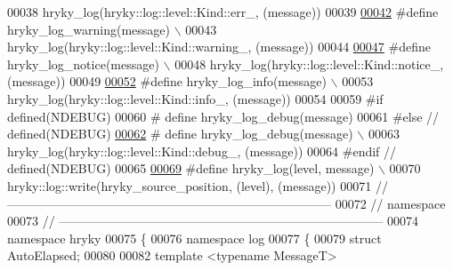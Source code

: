 \begin{DoxyCode}
00038 \textcolor{preprocessor}{    hryky\_log(hryky::log::level::Kind::err\_, (message))}
00039 \textcolor{preprocessor}{}
\hypertarget{log__writer__common_8h_source_l00042}{}\hyperlink{log__writer__common_8h_a1a150b0b31f517e34b4f6604348f3cbf}{00042} \textcolor{preprocessor}{#define hryky\_log\_warning(message) \(\backslash\)}
00043 \textcolor{preprocessor}{    hryky\_log(hryky::log::level::Kind::warning\_, (message))}
00044 \textcolor{preprocessor}{}
\hypertarget{log__writer__common_8h_source_l00047}{}\hyperlink{log__writer__common_8h_ab209c7143422edf2ce0c5baa844629d7}{00047} \textcolor{preprocessor}{#define hryky\_log\_notice(message) \(\backslash\)}
00048 \textcolor{preprocessor}{    hryky\_log(hryky::log::level::Kind::notice\_, (message))}
00049 \textcolor{preprocessor}{}
\hypertarget{log__writer__common_8h_source_l00052}{}\hyperlink{log__writer__common_8h_a7a87a8f432de12bbdfa8d6ee1a998fe2}{00052} \textcolor{preprocessor}{#define hryky\_log\_info(message) \(\backslash\)}
00053 \textcolor{preprocessor}{    hryky\_log(hryky::log::level::Kind::info\_, (message))}
00054 \textcolor{preprocessor}{}
00059 \textcolor{preprocessor}{#if defined(NDEBUG)}
00060 \textcolor{preprocessor}{}\textcolor{preprocessor}{#   define hryky\_log\_debug(message)}
00061 \textcolor{preprocessor}{}\textcolor{preprocessor}{#else // defined(NDEBUG)}
\hypertarget{log__writer__common_8h_source_l00062}{}\hyperlink{log__writer__common_8h_ad94e7301fdfeec6ecd1cb63b4c81325a}{00062} \textcolor{preprocessor}{}\textcolor{preprocessor}{#   define hryky\_log\_debug(message) \(\backslash\)}
00063 \textcolor{preprocessor}{    hryky\_log(hryky::log::level::Kind::debug\_, (message))}
00064 \textcolor{preprocessor}{}\textcolor{preprocessor}{#endif // defined(NDEBUG)}
00065 \textcolor{preprocessor}{}
\hypertarget{log__writer__common_8h_source_l00069}{}\hyperlink{log__writer__common_8h_afae8fb8916745daf220c3d3da57ce825}{00069} \textcolor{preprocessor}{#define hryky\_log(level, message) \(\backslash\)}
00070 \textcolor{preprocessor}{    hryky::log::write(hryky\_source\_position, (level), (message))}
00071 \textcolor{preprocessor}{}\textcolor{comment}{//
      ------------------------------------------------------------------------------}
00072 \textcolor{comment}{// namespace}
00073 \textcolor{comment}{//
      ------------------------------------------------------------------------------}
00074 \textcolor{keyword}{namespace }hryky
00075 \{
00076 \textcolor{keyword}{namespace }log
00077 \{
00079     \textcolor{keyword}{struct }AutoElapsed;
00080 
00082     \textcolor{keyword}{template} <\textcolor{keyword}{typename} MessageT>

\end{DoxyCode}
